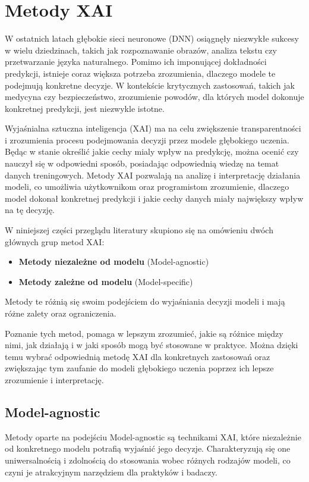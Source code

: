 \section*{Metody XAI}
W ostatnich latach głębokie sieci neuronowe (DNN) osiągnęły niezwykłe sukcesy w wielu dziedzinach, takich jak rozpoznawanie obrazów, analiza tekstu czy przetwarzanie języka naturalnego.
Pomimo ich imponującej dokładności predykcji, istnieje coraz większa potrzeba zrozumienia, dlaczego modele te podejmują konkretne decyzje.
W kontekście krytycznych zastosowań, takich jak medycyna czy bezpieczeństwo, zrozumienie powodów, dla których model dokonuje konkretnej predykcji, jest niezwykle istotne.

Wyjaśnialna sztuczna inteligencja (XAI) ma na celu zwiększenie transparentności i zrozumienia procesu podejmowania decyzji przez modele głębokiego uczenia.
Będąc w stanie określić jakie cechy mialy wpływ na predykcję, można ocenić czy nauczył się w odpowiedni sposób, posiadając odpowiednią wiedzę na temat danych treningowych.
Metody XAI pozwalają na analizę i interpretację działania modeli, co umożliwia użytkownikom oraz programistom zrozumienie, dlaczego model dokonał konkretnej predykcji i jakie cechy danych miały największy wpływ na tę decyzję.

W niniejszej części przeglądu literatury skupiono się na omówieniu dwóch głównych grup metod XAI:
\begin{itemize}
	\item \textbf{Metody niezależne od modelu} (Model-agnostic)
	\item \textbf{Metody zależne od modelu} (Model-specific)
\end{itemize}
Metody te różnią się swoim podejściem do wyjaśniania decyzji modeli i mają różne zalety oraz ograniczenia.

Poznanie tych metod, pomaga w lepszym zrozumieć, jakie są różnice między nimi, jak działają i w jaki sposób mogą być stosowane w praktyce.
Można dzięki temu wybrać odpowiednią metodę XAI dla konkretnych zastosowań oraz zwiększając tym zaufanie do modeli głębokiego uczenia poprzez ich lepsze zrozumienie i interpretację.

\subsection*{Model-agnostic}
Metody oparte na podejściu Model-agnostic są technikami XAI, które niezależnie od konkretnego modelu potrafią wyjaśnić jego decyzje.
Charakteryzują się one uniwersalnością i zdolnością do stosowania wobec różnych rodzajów modeli, co czyni je atrakcyjnym narzędziem dla praktyków i badaczy.

